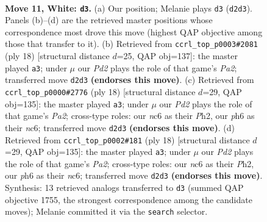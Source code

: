 \documentclass[11pt]{article}
\begin{document}
\clearpage

\begin{figure}[p]\centering
\begin{subfigure}{0.46\textwidth}\centering
\resizebox{\linewidth}{!}{%
\newchessgame
\chessboard[
  setfen={r2q1rk1/1bp1bpp1/p1np1n1p/1p2p3/4P3/PBN2N1P/1PPP1PP1/R1BQR1K1 w - - 0 11},
  showmover=false,
  pgfstyle=straightmove, color=movearrow, markmove={d2-d3}
]}
\caption{}
\end{subfigure}\hfill
\begin{subfigure}{0.46\textwidth}\centering
\resizebox{\linewidth}{!}{%
\newchessgame
\chessboard[
  setfen={r2q1rk1/1bp1bppp/p1np1n2/1p2p3/4P3/1BN2N1P/PPPP1PP1/R1BQR1K1 w - - 0 10},
  showmover=false,
  pgfstyle=straightmove, color=movearrow, markmove={a2-a3}
]}
\caption{}
\end{subfigure}
\\[4pt]
\begin{subfigure}{0.46\textwidth}\centering
\resizebox{\linewidth}{!}{%
\newchessgame
\chessboard[
  setfen={r2q1rk1/1bp1bppp/p1np1n2/1p2p3/4P3/1BNP1N2/PPP2PPP/R1BQR1K1 w - - 0 10},
  showmover=false,
  pgfstyle=straightmove, color=movearrow, markmove={a2-a3}
]}
\caption{}
\end{subfigure}\hfill
\begin{subfigure}{0.46\textwidth}\centering
\resizebox{\linewidth}{!}{%
\newchessgame
\chessboard[
  setfen={r2q1rk1/1bp1bppp/p1np1n2/1p2p3/4P3/1BNP1N2/PPP2PPP/R1BQR1K1 w - - 0 10},
  showmover=false,
  pgfstyle=straightmove, color=movearrow, markmove={a2-a3}
]}
\caption{}
\end{subfigure}
\caption{\textbf{Move 11, White: \texttt{d3}.} (a) Our position; Melanie plays \texttt{d3} (\texttt{d2d3}). Panels (b)--(d) are the retrieved master positions whose correspondence most drove this move (highest QAP objective among those that transfer to it). (b) Retrieved from \texttt{ccrl\_top\_p0003\#2081} (ply 18) [structural distance $d$=25, QAP obj=137]: the master played \texttt{a3}; under $\mu$ our \emph{Pd2} plays the role of that game's \emph{Pa2}; transferred move \texttt{d2d3} \textbf{(endorses this move)}. (c) Retrieved from \texttt{ccrl\_top\_p0000\#2776} (ply 18) [structural distance $d$=29, QAP obj=135]: the master played \texttt{a3}; under $\mu$ our \emph{Pd2} plays the role of that game's \emph{Pa2}; cross-type roles: our \emph{n}c6 as their \emph{P}h2, our \emph{p}h6 as their \emph{n}c6; transferred move \texttt{d2d3} \textbf{(endorses this move)}. (d) Retrieved from \texttt{ccrl\_top\_p0002\#181} (ply 18) [structural distance $d$=29, QAP obj=135]: the master played \texttt{a3}; under $\mu$ our \emph{Pd2} plays the role of that game's \emph{Pa2}; cross-type roles: our \emph{n}c6 as their \emph{P}h2, our \emph{p}h6 as their \emph{n}c6; transferred move \texttt{d2d3} \textbf{(endorses this move)}. Synthesis: 13 retrieved analogs transferred to \texttt{d3} (summed QAP objective 1755, the strongest correspondence among the candidate moves); Melanie committed it via the \texttt{search} selector.}
\label{fig:thought-m20}
\end{figure}
\end{document}
